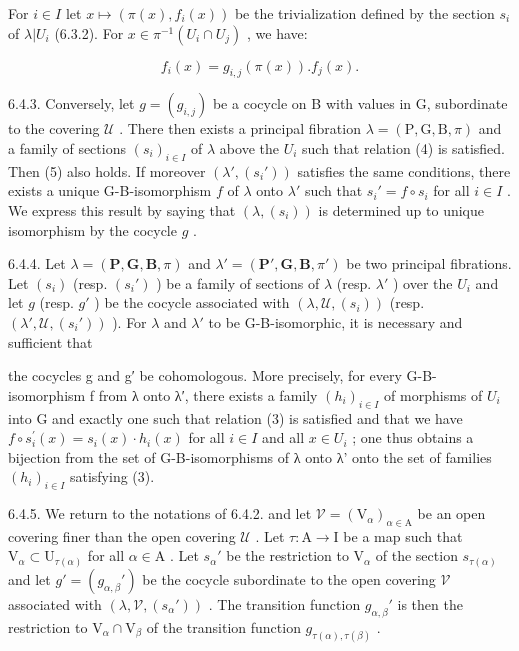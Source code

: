 For \(i \in I\) let \(x \mapsto (\pi(x), f_i(x))\) be the trivialization defined by the section \(s_i\) of \(\lambda |U_i\) (6.3.2). For \(x \in \pi^{-1}(U_i \cap U_j)\) , we have:

\[
f _ {i} (x) = g _ {i, j} (\pi (x)). f _ {j} (x).\tag{5}
\]

6.4.3. Conversely, let \(g = (g_{i,j})\) be a cocycle on B with values in G, subordinate to the covering \(\mathcal{U}\) . There then exists a principal fibration \(\lambda = (\mathrm{P},\mathrm{G},\mathrm{B},\pi)\) and a family of sections \((s_i)_{i\in I}\) of \(\lambda\) above the \(U_i\) such that relation (4) is satisfied. Then (5) also holds. If moreover \((\lambda',(s_i'))\) satisfies the same conditions, there exists a unique G-B-isomorphism \(f\) of \(\lambda\) onto \(\lambda'\) such that \(s_i' = f\circ s_i\) for all \(i\in I\) . We express this result by saying that \((\lambda,(s_i))\) is determined up to unique isomorphism by the cocycle \(g\) .

6.4.4. Let \(\lambda = (\mathbf{P}, \mathbf{G}, \mathbf{B}, \pi)\) and \(\lambda' = (\mathbf{P}', \mathbf{G}, \mathbf{B}, \pi')\) be two principal fibrations. Let \((s_i)\) (resp. \((s_i')\) ) be a family of sections of \(\lambda\) (resp. \(\lambda'\) ) over the \(U_i\) and let \(g\) (resp. \(g'\) ) be the cocycle associated with \((\lambda, \mathcal{U}, (s_i))\) (resp. \((\lambda', \mathcal{U}, (s_i'))\) ). For \(\lambda\) and \(\lambda'\) to be G-B-isomorphic, it is necessary and sufficient that

the cocycles g and g′ be cohomologous. More precisely, for every G-B-isomorphism f from λ onto λ′, there exists a family \((h_{i})_{i\in I}\) of morphisms of \(U_{i}\) into G and exactly one such that relation (3) is satisfied and that we have \(f\circ s_{i}^{\prime}(x)=s_{i}(x) \cdot h_{i}(x)\) for all \(i\in I\) and all \(x\in U_{i}\) ; one thus obtains a bijection from the set of G-B-isomorphisms of λ onto λ' onto the set of families \((h_{i})_{i\in I}\) satisfying (3).

6.4.5. We return to the notations of 6.4.2. and let \(\mathcal{V} = (\mathrm{V}_{\alpha})_{\alpha \in \mathrm{A}}\) be an open covering finer than the open covering \(\mathcal{U}\) . Let \(\tau : \mathrm{A} \to \mathrm{I}\) be a map such that \(\mathrm{V}_{\alpha} \subset \mathrm{U}_{\tau(\alpha)}\) for all \(\alpha \in \mathrm{A}\) . Let \(s_{\alpha}'\) be the restriction to \(\mathrm{V}_{\alpha}\) of the section \(s_{\tau(\alpha)}\) and let \(g' = (g_{\alpha,\beta}')\) be the cocycle subordinate to the open covering \(\mathcal{V}\) associated with \((\lambda, \mathcal{V}, (s_{\alpha}'))\) . The transition function \(g_{\alpha,\beta}'\) is then the restriction to \(\mathrm{V}_{\alpha} \cap \mathrm{V}_{\beta}\) of the transition function \(g_{\tau(\alpha),\tau(\beta)}\) .


